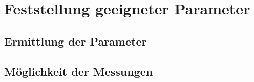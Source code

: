 \section{Feststellung geeigneter Parameter}
\subsection{Ermittlung der Parameter}
\subsection{Möglichkeit der Messungen}